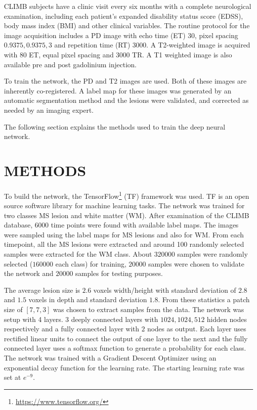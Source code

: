 \documentclass[]{spie}  %
\begin{document}
CLIMB subjects have a clinic visit every six months with a complete neurological examination, including each patient’s expanded disability status score (EDSS), body mass index (BMI) and other clinical variables. The routine protocol for the image acquisition includes a PD image with echo time (ET) 30, pixel spacing $0.9375,0.9375, 3$ and repetition time (RT) 3000. A T2-weighted image is acquired with 80 ET, equal pixel spacing and 3000 TR. A T1 weighted image is also 
available pre and post gadolinium injection. 

To train the network, the PD and T2 images are used. Both of these images are inherently co-registered. 
A label map for these images was generated by an automatic segmentation method and the lesions were validated, and corrected as needed by an imaging expert.

The following section explains the methods used to train the deep neural network. 

\section{METHODS} 
\label{sec:METHODS}

To build the network, the TensorFlow\footnote{\url{https://www.tensorflow.org/}} (TF) framework was used. TF is an open source software library for machine learning tasks.
The network was trained for two classes MS lesion and white matter (WM). 
After examination of the CLIMB database, 6000 time points were found with available label maps. 
The images were sampled using the label maps for MS lesions and also for WM. From each timepoint, all the MS lesions were extracted and around 100 randomly selected samples were extracted for the WM class. About $320000$ samples were randomly selected ($160000$ each class)
for training, $20000$ samples were chosen to validate the network and 
$20000$ samples for testing purposes. 

The average lesion size is $2.6$ voxels width/height with standard deviation of $2.8$ and $1.5$ voxels in depth and standard deviation $1.8$.
From these statistics a patch size of $[7, 7, 3]$ was chosen to extract samples from the data. 
The network was setup with 4 layers. 3 deeply connected layers with $1024, 1024, 512$ hidden nodes respectively and a fully connected layer 
with $2$ nodes as output. Each layer uses rectified linear units to connect the output of one layer to the next and the fully connected layer
uses a softmax function to generate a probability for each class.
The network was trained with a Gradient Descent Optimizer using an exponential decay function for the learning rate. 
The starting learning rate was set at $e^{-9}$.
\end{document}
